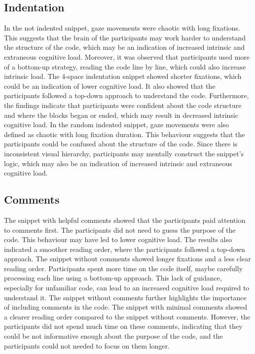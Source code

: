 \subsection{Indentation} 
In the not indented snippet, gaze movements were chaotic with long fixations. This suggests that the brain of the participants may work harder to understand the structure of the code, which may be an indication of increased intrinsic and extraneous cognitive load. Moreover, it was observed that participants used more of a bottom-up strategy, reading the code line by line, which could also increase intrinsic load.
The 4-space indentation snippet showed shorter fixations, which could be an indication of lower cognitive load. It also showed that the participants followed a top-down approach to understand the code. Furthermore, the findings indicate that participants were confident about the code structure and where the blocks began or ended, which may result in decreased intrinsic cognitive load.      
In the random indented snippet, gaze movements were also defined as chaotic with long fixation duration. This behaviour suggests that the participants could be confused about the structure of the code. Since there is inconsistent visual hierarchy, participants may mentally construct the snippet’s logic, which may also be an indication of increased intrinsic and extraneous cognitive load.    

\subsection{Comments} 
The snippet with helpful comments showed that the participants paid attention to comments first. The participants did not need to guess the purpose of the code. This behaviour may have led to lower cognitive load.  The results also indicated a smoother reading order, where the participants followed a top-down approach.
The snippet without comments showed longer fixations and a less clear reading order.  Participants spent more time on the code itself, maybe carefully processing each line using a bottom-up approach. This lack of guidance, especially for unfamiliar code, can lead to an increased cognitive load required to understand it.  The snippet without comments further highlights the importance of including comments in the code. The snippet with minimal comments showed a clearer reading order compared to the snippet without comments. However, the participants did not spend much time on these comments, indicating that they could be not informative enough about the purpose of the code, and the participants could not needed to focus on them longer. 

